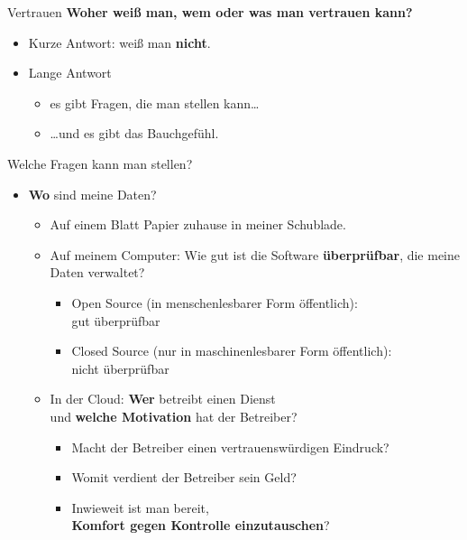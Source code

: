   \begin{frame}{Vertrauen}
    \textbf{Woher weiß man, wem oder was man vertrauen kann?}
    \begin{itemize}
      \item Kurze Antwort: weiß man \textbf{nicht}.
      \item Lange Antwort
      \begin{itemize}
        \item es gibt Fragen, die man stellen kann\ldots
        \item {\ldots}und es gibt das Bauchgefühl.
      \end{itemize}
    \end{itemize}
  \end{frame}
\begin{frame}{Welche Fragen kann man stellen?}
  \begin{itemize}
    \item \textbf{Wo} sind meine Daten?
    \begin{itemize}
      \item Auf einem Blatt Papier zuhause in meiner Schublade.
      \item Auf meinem Computer: Wie gut ist die Software \textbf{überprüfbar}, die meine Daten verwaltet?
        \begin{itemize}
          \item Open Source (in menschenlesbarer Form öffentlich):\\gut überprüfbar
          \item Closed Source (nur in maschinenlesbarer Form öffentlich):\\nicht überprüfbar
        \end{itemize}
      \item In der Cloud: \textbf{Wer} betreibt einen Dienst\\und \textbf{welche Motivation} hat der Betreiber?
        \begin{itemize}
          \item Macht der Betreiber einen vertrauenswürdigen Eindruck?
          \item Womit verdient der Betreiber sein Geld?
          \item Inwieweit ist man bereit,\\ \textbf{Komfort gegen Kontrolle einzutauschen}?
        \end{itemize}
    \end{itemize}
  \end{itemize}
\end{frame}

